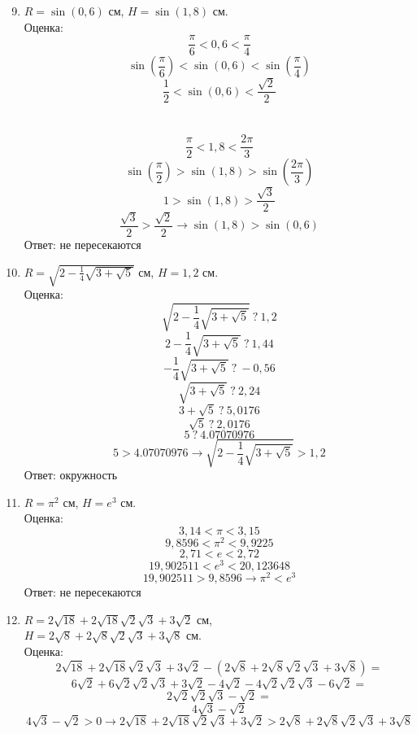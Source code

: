     \begin{enumerate}
        \setcounter{enumi}{8}
        \item $R = \sin(0,6)$ см, $H = \sin(1,8)$ см.\\
        Оценка:
        \[ \frac{\pi}{6} < 0,6 < \frac{\pi}{4} \]
        \[ \sin\left(\frac{\pi}{6}\right) < \sin(0,6) < \sin\left(\frac{\pi}{4}\right) \]
        \[ \frac{1}{2} < \sin(0,6) < \frac{\sqrt {2}}{2} \]
        \hline \\ \
        \[ \frac{\pi}{2} < 1,8 < \frac{2\pi}{3} \]
        \[ \sin\left(\frac{\pi}{2}\right) > \sin(1,8) > \sin\left(\frac{2\pi}{3}\right) \]
        \[ 1 > \sin(1,8) > \frac{\sqrt {3}}{2} \]
        \hline
        \[ \frac{\sqrt{3}}{2} > \frac{\sqrt{2}}{2} \rightarrow \sin(1,8) > \sin(0,6) \]
        Ответ: не пересекаются

        \item $R = \sqrt{2 - \frac{1}{4}\sqrt{3 + \sqrt{5}}}$ см, $H = 1,2$ см.\\
        Оценка:
        \[  \sqrt{2 - \frac{1}{4}\sqrt{3 + \sqrt{5}}} \ ? \ 1,2 \]
        \[ 2 - \frac{1}{4}\sqrt{3 + \sqrt{5}} \ ? \ 1,44 \]
        \[ - \frac{1}{4}\sqrt{3 + \sqrt{5}} \ ? \ -0,56\]
        \[\sqrt{3 + \sqrt{5}} \ ? \ 2,24 \]
        \[ 3 + \sqrt{5} \ ? \ 5,0176\]
        \[ \sqrt{5} \ ? \ 2,0176\]
        \[ 5 \ ? \ 4.07070976 \]
        \[ 5 > 4.07070976 \rightarrow \sqrt{2 - \frac{1}{4}\sqrt{3 + \sqrt{5}}} > 1,2 \]
        Ответ: окружность

        \item $R = \pi ^ 2$ см, $H = e ^ 3$ см.\\
        Оценка:
        \[  3,14 < \pi < 3,15\]
        \[  9,8596 < \pi ^ 2 < 9,9225 \]
        \hline
        \[  2,71 < e < 2,72 \]
        \[  19,902511 < e^3 < 20,123648 \]
        \hline
        \[ 19,902511 > 9,8596 \rightarrow \pi ^ 2 < e ^ 3\]
        Ответ: не пересекаются

        \item $R = 2\sqrt{18} + 2\sqrt{18}\sqrt{2}\sqrt{3} + 3\sqrt{2}$ см, \\
        $H = 2\sqrt{8} + 2\sqrt{8}\sqrt{2}\sqrt{3} + 3\sqrt{8}$ см.\\
        Оценка:
        \[ 2\sqrt{18} + 2\sqrt{18}\sqrt{2}\sqrt{3} + 3\sqrt{2} - (2\sqrt{8} + 2\sqrt{8}\sqrt{2}\sqrt{3} + 3\sqrt{8}) = \]
        \[ 6\sqrt{2} + 6\sqrt{2}\sqrt{2}\sqrt{3} + 3\sqrt{2} - 4\sqrt{2} - 4\sqrt{2}\sqrt{2}\sqrt{3} - 6\sqrt{2} = \]
        \[ 2\sqrt{2}\sqrt{2}\sqrt{3} - \sqrt{2}  = \]
        \[ 4\sqrt{3} - \sqrt{2} \]
        \[ 4\sqrt{3} - \sqrt{2}  > 0 \rightarrow  2\sqrt{18} + 2\sqrt{18}\sqrt{2}\sqrt{3} + 3\sqrt{2} > 2\sqrt{8} + 2\sqrt{8}\sqrt{2}\sqrt{3} + 3\sqrt{8} \]
    \end{enumerate}

